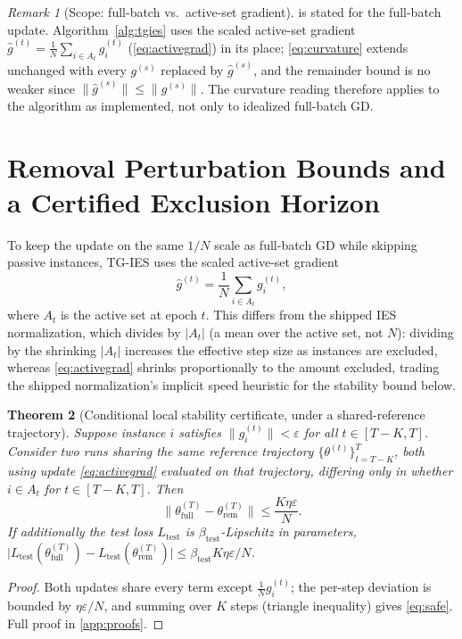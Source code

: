 \documentclass{article}
\theoremstyle{plain}
\newtheorem{theorem}{Theorem}[section]
\theoremstyle{definition}
\theoremstyle{remark}
\newtheorem{remark}[theorem]{Remark}
\begin{document}
\begin{remark}[Scope: full-batch vs.\ active-set gradient]
\label{rem:activeset}
 is stated for the full-batch update. Algorithm~\ref{alg:tgies} uses the scaled active-set gradient $\hat g^{(t)} = \frac1N\sum_{i\in A_t}g_i^{(t)}$ (\cref{eq:activegrad}) in its place; \cref{eq:curvature} extends unchanged with every $g^{(s)}$ replaced by $\hat g^{(s)}$, and the remainder bound is no weaker since $\|\hat g^{(s)}\| \le \|g^{(s)}\|$. The curvature reading therefore applies to the algorithm as implemented, not only to idealized full-batch GD.
\end{remark}

\section{Removal Perturbation Bounds and a Certified Exclusion Horizon}
\label{sec:level4}

To keep the update on the same $1/N$ scale as full-batch GD while skipping passive instances, TG-IES uses the scaled active-set gradient
\begin{equation}
\label{eq:activegrad}
\hat g^{(t)} = \frac1N \sum_{i\in A_t} g_i^{(t)},
\end{equation}
where $A_t$ is the active set at epoch $t$. This differs from the shipped IES normalization, which divides by $|A_t|$ (a mean over the active set, not $N$): dividing by the shrinking $|A_t|$ increases the effective step size as instances are excluded, whereas \cref{eq:activegrad} shrinks proportionally to the amount excluded, trading the shipped normalization's implicit speed heuristic for the stability bound below.

\begin{theorem}[Conditional local stability certificate, under a shared-reference trajectory]
\label{thm:safe}
Suppose instance $i$ satisfies $\|g_i^{(t)}\| < \varepsilon$ for all $t\in[T-K,T]$. Consider two runs sharing the same reference trajectory $\{\theta^{(t)}\}_{t=T-K}^T$, both using update \cref{eq:activegrad} evaluated on that trajectory, differing only in whether $i \in A_t$ for $t\in[T-K,T]$. Then
\begin{equation}
\label{eq:safe}
\big\|\theta^{(T)}_{\mathrm{full}} - \theta^{(T)}_{\mathrm{rem}}\big\| \le \frac{K\eta\varepsilon}{N}.
\end{equation}
If additionally the test loss $L_{\mathrm{test}}$ is $\beta_{\mathrm{test}}$-Lipschitz in parameters,
$\big|L_{\mathrm{test}}(\theta^{(T)}_{\mathrm{full}}) - L_{\mathrm{test}}(\theta^{(T)}_{\mathrm{rem}})\big| \le \beta_{\mathrm{test}} K\eta\varepsilon/N$.
\end{theorem}
\begin{proof}
Both updates share every term except $\frac1N g_i^{(t)}$; the per-step deviation is bounded by $\eta\varepsilon/N$, and summing over $K$ steps (triangle inequality) gives \cref{eq:safe}. Full proof in \cref{app:proofs}.
\end{proof}
\end{document}
